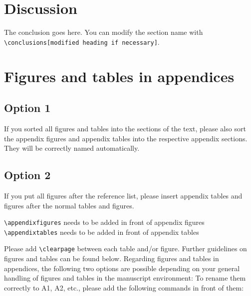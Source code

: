 \documentclass[gc, manuscript]{copernicus}
\begin{document}
\section{Discussion}

\conclusions

The conclusion goes here. You can modify the section name with
\texttt{\textbackslash{}conclusions{[}modified\ heading\ if\ necessary{]}}.








\appendix
\section{Figures and tables in appendices}\subsection{Option 1}

If you sorted all figures and tables into the sections of the text,
please also sort the appendix figures and appendix tables into the
respective appendix sections. They will be correctly named
automatically. \subsection{Option 2} If you put all figures after the
reference list, please insert appendix tables and figures after the
normal tables and figures.

\texttt{\textbackslash{}appendixfigures} needs to be added in front of
appendix figures \texttt{\textbackslash{}appendixtables} needs to be
added in front of appendix tables

Please add \texttt{\textbackslash{}clearpage} between each table and/or
figure. Further guidelines on figures and tables can be found below.
Regarding figures and tables in appendices, the following two options
are possible depending on your general handling of figures and tables in
the manuscript environment: To rename them correctly to A1, A2, etc.,
please add the following commands in front of them:
\noappendix

\end{document}
